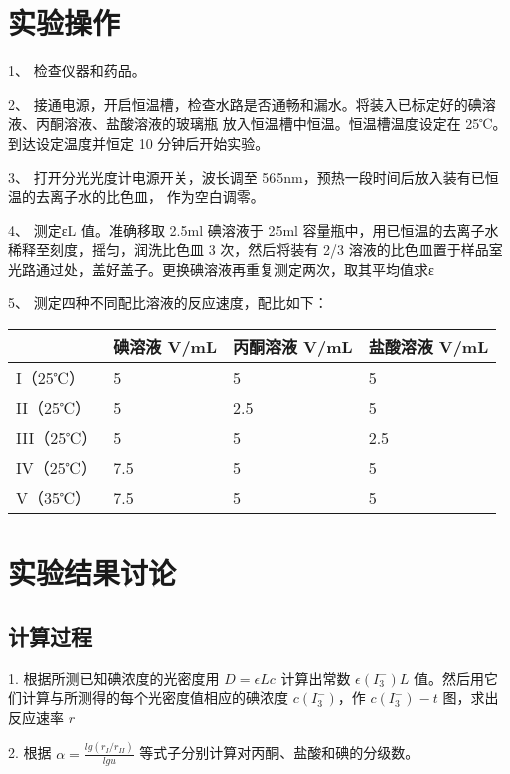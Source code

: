 \documentclass[4pt,a4papper]{article}
\begin{document}
\section{实验操作}
1、 检查仪器和药品。

2、 接通电源，开启恒温槽，检查水路是否通畅和漏水。将装入已标定好的碘溶液、丙酮溶液、盐酸溶液的玻璃瓶 放入恒温槽中恒温。恒温槽温度设定在 25℃。到达设定温度并恒定 10 分钟后开始实验。 

3、 打开分光光度计电源开关，波长调至 565nm，预热一段时间后放入装有已恒温的去离子水的比色皿， 作为空白调零。

4、 测定εL 值。准确移取 2.5ml 碘溶液于 25ml 容量瓶中，用已恒温的去离子水稀释至刻度，摇匀，润洗比色皿 3 次，然后将装有 2/3 溶液的比色皿置于样品室光路通过处，盖好盖子。更换碘溶液再重复测定两次，取其平均值求ε

5、 测定四种不同配比溶液的反应速度，配比如下：

\begin{table}[htbp]
\centering
\begin{tabular}{|l|l|l|l|}
\hline
         & 碘溶液 V/mL & 丙酮溶液 V/mL & 盐酸溶液 V/mL \\ \hline
I（25℃）   & 5        & 5         & 5         \\ \hline
II（25℃）  & 5        & 2.5       & 5         \\ \hline
III（25℃） & 5        & 5         & 2.5       \\ \hline
IV（25℃）  & 7.5      & 5         & 5         \\ \hline
V（35℃）   & 7.5      & 5         & 5         \\ \hline
\end{tabular}
\end{table}




\section{实验结果讨论}
\subsection{计算过程}
1. 根据所测已知碘浓度的光密度用 $D = \epsilon Lc$ 计算出常数 $\epsilon (I_3^-)L$ 值。然后用它们计算与所测得的每个光密度值相应的碘浓度 $c(I_3^-)$，作 $c(I_3^-) - t$ 图，求出反应速率 $r$
 
2. 根据 $\alpha= \frac{lg(r_I/r_{II})}{lgu}$ 等式子分别计算对丙酮、盐酸和碘的分级数。 
\end{document}
